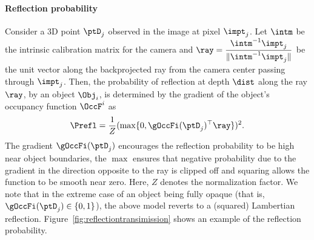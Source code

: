 \vspace{-0.3cm}
\paragraph{Reflection probability}
Consider a 3D point $\ptD_j$ observed in the image at pixel $\impt_j$. Let $\intm$ be the intrinsic calibration matrix for the camera and $\ray = \displaystyle\frac{\intm^{-1}\impt_j}{\lVert \intm^{-1}\impt_j \rVert}$ be the unit vector along the backprojected ray from the camera center passing through $\impt_j$. Then, the probability of reflection at depth $\dist$ along the ray $\ray$, by an object $\Obj_i$, is determined by the gradient of the object's occupancy function $\OccF^i$ as
\begin{align}
   \Prefl = \frac{1}{Z}(\max \{0, \gOccFi(\ptD_j)^\top \ray \})^2.
\label{eq:evalPrefl}
\end{align}
The gradient $\gOccFi(\ptD_j)$ encourages the reflection probability to be high near object boundaries, the $\max$ ensures that negative probability due to the gradient in the direction opposite to the ray is clipped off and squaring allows the function to be smooth near zero. Here, $Z$ denotes the normalization factor. We note that in the extreme case of an object being fully opaque (that is, $\gOccFi(\ptD_j) \in \{0,1\}$), the above model reverts to a (squared) Lambertian reflection. Figure~\ref{fig:reflectiontransimission} shows an example of the reflection probability.

\vspace{-0.3cm}
